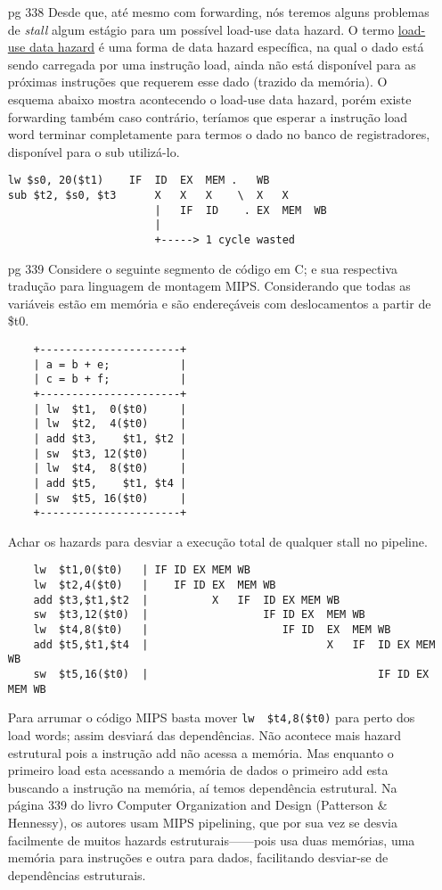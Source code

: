 \documentclass{article}
\begin{document}
\begin{enumerate}
\item[pg 338] Desde que, até mesmo com forwarding, nós teremos alguns problemas
de \textit{stall} algum estágio para um possível load-use data hazard. O termo
\underline{load-use data hazard} é uma forma de data hazard específica, na qual
o dado está sendo carregada por uma instrução load, ainda não está disponível
para as próximas instruções que requerem esse dado (trazido da memória). O
esquema abaixo mostra acontecendo o load-use data hazard, porém existe
forwarding também caso contrário, teríamos que esperar a instrução load word
terminar completamente para termos o dado no banco de registradores, disponível
para o sub utilizá-lo.

\begin{verbatim}
lw $s0, 20($t1)    IF  ID  EX  MEM .   WB
sub $t2, $s0, $t3      X   X   X    \  X   X
                       |   IF  ID    . EX  MEM  WB
                       |
                       +-----> 1 cycle wasted
\end{verbatim}

\item[pg 339] Considere o seguinte segmento de código em C; e sua respectiva 
tradução para linguagem de montagem MIPS. Considerando que todas as variáveis 
estão em memória e são endereçáveis com deslocamentos a partir de \$t0.

  \begin{verbatim}
    +----------------------+
    | a = b + e;           |
    | c = b + f;           |
    +----------------------+
    | lw  $t1,  0($t0)     |
    | lw  $t2,  4($t0)     |
    | add $t3,    $t1, $t2 |
    | sw  $t3, 12($t0)     |
    | lw  $t4,  8($t0)     |
    | add $t5,    $t1, $t4 |
    | sw  $t5, 16($t0)     |
    +----------------------+
  \end{verbatim}

Achar os hazards para desviar a execução total de qualquer stall no pipeline.

  \begin{verbatim}
    lw  $t1,0($t0)   | IF ID EX MEM WB
    lw  $t2,4($t0)   |    IF ID EX  MEM WB
    add $t3,$t1,$t2  |          X   IF  ID EX MEM WB
    sw  $t3,12($t0)  |                  IF ID EX  MEM WB
    lw  $t4,8($t0)   |                     IF ID  EX  MEM WB
    add $t5,$t1,$t4  |                            X   IF  ID EX MEM WB
    sw  $t5,16($t0)  |                                    IF ID EX  MEM WB
  \end{verbatim}

\clearpage
Para arrumar o código MIPS basta mover \verb|lw  $t4,8($t0)| para perto dos load
words; assim desviará das dependências. Não acontece mais hazard estrutural pois
a instrução add não acessa a memória. Mas enquanto o primeiro load esta
acessando a memória de dados o primeiro add esta buscando a instrução na
memória, aí temos dependência estrutural. Na página 339 do livro Computer
Organization and Design (Patterson \& Hennessy), os autores usam MIPS
pipelining, que por sua vez se desvia facilmente de muitos hazards
estruturais------pois usa duas memórias, uma memória para instruções e outra
para dados, facilitando desviar-se de dependências estruturais.


\end{enumerate}
\end{document}

